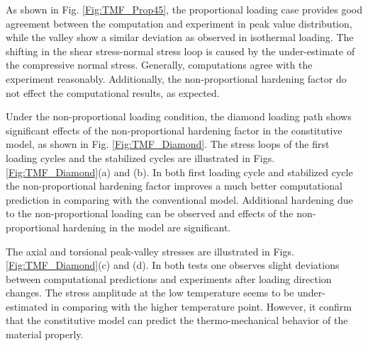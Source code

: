 \documentclass[preprint,5p,twocolumn,11pt,sort&compress]{elsarticle}
\begin{document}
As shown in Fig. \ref{Fig:TMF_Prop45}, the proportional loading case provides good agreement between the computation and experiment in peak value distribution, while the valley show a similar deviation as observed in isothermal loading. The shifting in the shear stress-normal stress loop is caused by the under-estimate of the compressive normal stress. Generally, computations agree with the experiment reasonably. Additionally, the non-proportional hardening factor do not effect the computational results, as expected.

Under the non-proportional loading condition, the diamond loading path shows significant effects of the non-proportional hardening factor  in the constitutive model, as shown in Fig. \ref{Fig:TMF_Diamond}. The stress loops of the first loading cycles and the stabilized cycles are illustrated in Figs. \ref{Fig:TMF_Diamond}(a) and (b). In both first loading cycle and stabilized cycle the non-proportional hardening factor improves a much better computational prediction in comparing with the conventional model. Additional hardening due to the non-proportional loading can be observed and effects of the non-proportional hardening in the model are significant.

The axial and torsional peak-valley stresses are illustrated in  Figs. \ref{Fig:TMF_Diamond}(c) and (d).
In both tests one observes slight deviations between computational predictions and experiments after  loading direction changes. The stress amplitude at the low temperature seems to be under-estimated in comparing with the higher temperature point. However, it confirm that the constitutive model can predict the thermo-mechanical behavior of the material properly.

\end{document}
